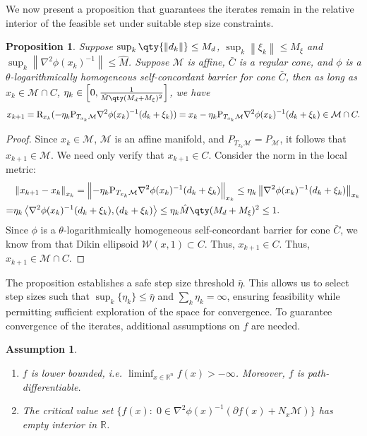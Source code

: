 \documentclass[11pt]{article}
\newcommand{\R}{\mathbb R}
\newcommand{\cM}{\mathcal M}
\def\norm#1{\left\|#1\right\|}
\def\inner#1{\left\langle#1\right\rangle}
\newtheorem{proposition}{Proposition}[section]
\newtheorem{assumption}{Assumption}[section]
\begin{document}
We now present a proposition that guarantees the iterates remain in the relative interior of the feasible set under suitable step size constraints.
\begin{proposition}
\label{prop:stepsize_threshhold}
Suppose $\sup_{k}\qty{\norm{d_k}}\leq M_d$, $\sup_{k}\norm{\xi_k}\leq M_\xi$ and $\sup_{k}\norm{\nabla^2\phi(x_k)^{-1}}\leq\hat M$. Suppose $\cM$ is affine, $\bar C$ is a regular cone, and $\phi$ is a $\theta$-logarithmically homogeneous self-concordant barrier for cone $\bar C$, then as long as $x_k\in\cM\cap C$, $\eta_k\in\left[0,\frac{1}{\hat M\qty(M_d+M_\xi)^2}\right]$, we have 
\[
x_{k+1}={\rm R}_{x_k}(-\eta_k{\rm P}_{T_{x_k}\cM}\nabla^2\phi(x_k)^{-1}(d_k+\xi_k))=x_k-\eta_k{\rm P}_{T_{x_k}\cM}\nabla^2\phi(x_k)^{-1}(d_k+\xi_k)\in\cM\cap C.
\]
\end{proposition}
\begin{proof}
Since $x_k\in\cM$, $\mathcal{M}$ is an affine manifold, and $P_{T_{x_k} \mathcal{M}} = P_{\mathcal{M}}$, it follows that $x_{k+1} \in \mathcal{M}$. We need only verify that $x_{k+1} \in C$. Consider the norm in the local metric:
\[
\begin{aligned}
&\norm{x_{k+1}-x_k}_{x_k}=\norm{-\eta_k{\rm P}_{T_{x_k}\cM}\nabla^2\phi(x_k)^{-1}(d_k+\xi_k)}_{x_k}\leq\eta_k\norm{ \nabla^2\phi(x_k)^{-1}(d_k+\xi_k)}_{x_k}\\
=&\eta_k\inner{\nabla^2\phi(x_k)^{-1}(d_k+\xi_k),(d_k+\xi_k)}\leq\eta_k \hat M\qty(M_d+M_\xi)^2\leq1.
\end{aligned}
\]
Since $\phi$ is a $\theta$-logarithmically homogeneous self-concordant barrier for cone $\bar C$, we know from \cite[Theorem 5.1.5]{nesterov2018lectures} that Dikin ellipsoid $\mathcal{W}(x,1)\subset C$. Thus, $x_{k+1}\in C$. Thus, $x_{k+1}\in\cM\cap C$.
\end{proof}
The proposition establishes a safe step size threshold $\bar{\eta}$. This allows us to select step sizes such that $\sup_k \{\eta_k\} \leq \bar{\eta}$ and $\sum_k \eta_k = \infty$, ensuring feasibility while permitting sufficient exploration of the space for convergence. To guarantee convergence of the iterates, additional assumptions on $f$ are needed. 
\begin{assumption}    \label{assumption:Lyapunov_RHBA}
    \begin{enumerate}
        \item $f$ is lower bounded, i.e. $\liminf_{x\in\R^n}f(x)>-\infty$. Moreover, $f$ is path-differentiable.
        \item The critical value set $\{f(x):\;0\in \nabla^2\phi(x)^{-1}(\partial f(x)+N_{x}\cM)\}$ has empty interior in $\R$.
    \end{enumerate}
\end{assumption}
\end{document}
